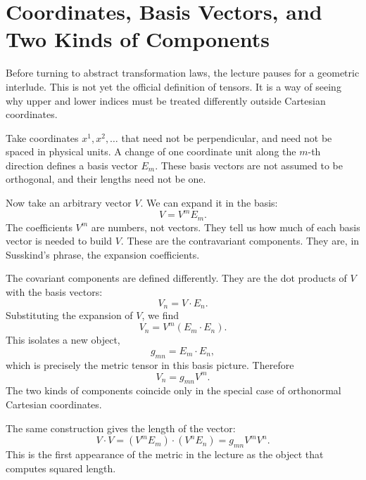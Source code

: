 \section{Coordinates, Basis Vectors, and Two Kinds of Components}

Before turning to abstract transformation laws, the lecture pauses for a geometric interlude. This is not yet the official definition of tensors. It is a way of seeing why upper and lower indices must be treated differently outside Cartesian coordinates.

Take coordinates \(x^1,x^2,\dots\) that need not be perpendicular, and need not be spaced in physical units. A change of one coordinate unit along the \(m\)-th direction defines a basis vector \(E_m\). These basis vectors are not assumed to be orthogonal, and their lengths need not be one.

Now take an arbitrary vector \(V\). We can expand it in the basis:
\begin{equation}
V = V^m E_m.
\end{equation}
The coefficients \(V^m\) are numbers, not vectors. They tell us how much of each basis vector is needed to build \(V\). These are the contravariant components. They are, in Susskind's phrase, the expansion coefficients.

The covariant components are defined differently. They are the dot products of \(V\) with the basis vectors:
\begin{equation}
V_n = V \cdot E_n.
\end{equation}
Substituting the expansion of \(V\), we find
\begin{equation}
V_n = V^m(E_m\cdot E_n).
\end{equation}
This isolates a new object,
\begin{equation}
g_{mn}=E_m\cdot E_n,
\end{equation}
which is precisely the metric tensor in this basis picture. Therefore
\begin{equation}
V_n=g_{mn}V^m.
\end{equation}
The two kinds of components coincide only in the special case of orthonormal Cartesian coordinates.

The same construction gives the length of the vector:
\begin{equation}
V\cdot V=(V^mE_m)\cdot(V^nE_n)=g_{mn}V^mV^n.
\end{equation}
This is the first appearance of the metric in the lecture as the object that computes squared length.

